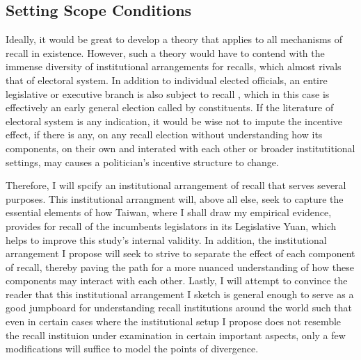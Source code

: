 \documentclass[hyphens, crop=false]{standalone}
\begin{document}
		\subsection*{Setting Scope Conditions}
		Ideally, it would be great to develop a theory that applies to all mechanisms of recall in existence.
		However, such a theory would have to contend with the immense diversity of 
		institutional arrangements for recalls, which
		almost rivals that of electoral system.
		In addition to individual elected officials,
		an entire legislative or executive branch is also subject to recall
		\autocite{welpRecallReferendumWorld2020},
		which in this case is effectively an early general election called by constituents.
		If the literature of electoral system is any indication, it would be wise not to impute the
		incentive effect,
		if there is any,
		on any recall election without understanding how 
		its components,
		on their own and interated with each other or broader institutitional settings,
		may causes a politician's incentive structure to change.
		
		Therefore, I will spcify an institutional arrangement of recall that serves several purposes.
		This institutional arrangment will,
		above all else,
		seek to capture the essential elements of
		how Taiwan, where I shall draw my empirical evidence,
		provides for recall of the incumbents legislators in its Legislative Yuan,
		which helps to improve this study's internal validity.
		In addition, the institutional arrangement I propose will seek to
		strive to separate the effect of each component of recall,
		thereby paving the path for a more nuanced understanding of how these components may interact with each other.
		Lastly,
		I will attempt to convince the reader that
		this institutional arrangement I sketch is general enough to
		serve as a good jumpboard for understanding recall institutions around the world such that
		even in certain cases where the institutional setup I propose does not resemble the recall instituion under examination in certain important aspects,
		only a few modifications will suffice to model the points of divergence.
		
\end{document}
